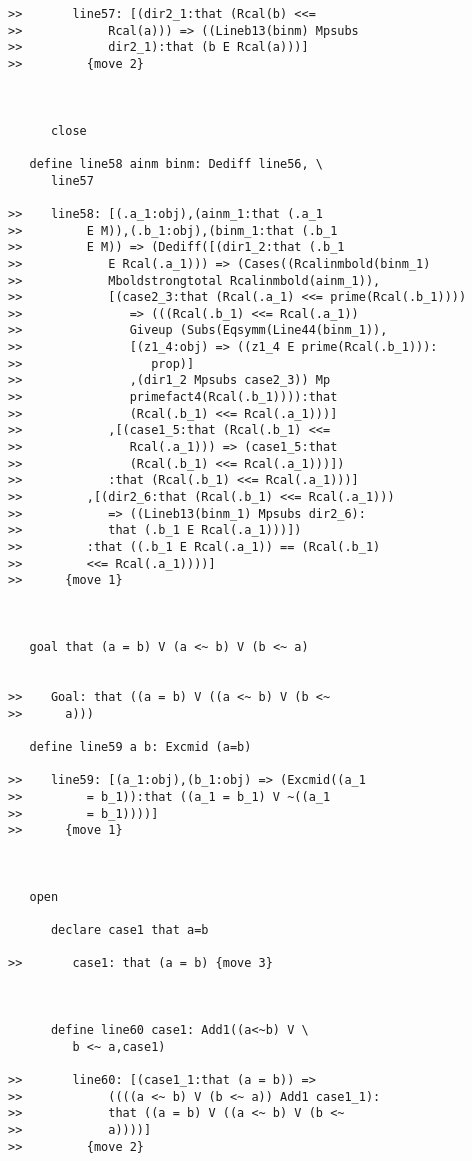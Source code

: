 \documentclass[12pt]{article}
\begin{document}
\begin{verbatim}
>>       line57: [(dir2_1:that (Rcal(b) <<=
>>            Rcal(a))) => ((Lineb13(binm) Mpsubs
>>            dir2_1):that (b E Rcal(a)))]
>>         {move 2}



      close

   define line58 ainm binm: Dediff line56, \
      line57

>>    line58: [(.a_1:obj),(ainm_1:that (.a_1
>>         E M)),(.b_1:obj),(binm_1:that (.b_1
>>         E M)) => (Dediff([(dir1_2:that (.b_1
>>            E Rcal(.a_1))) => (Cases((Rcalinmbold(binm_1)
>>            Mboldstrongtotal Rcalinmbold(ainm_1)),
>>            [(case2_3:that (Rcal(.a_1) <<= prime(Rcal(.b_1))))
>>               => (((Rcal(.b_1) <<= Rcal(.a_1))
>>               Giveup (Subs(Eqsymm(Line44(binm_1)),
>>               [(z1_4:obj) => ((z1_4 E prime(Rcal(.b_1))):
>>                  prop)]
>>               ,(dir1_2 Mpsubs case2_3)) Mp
>>               primefact4(Rcal(.b_1)))):that
>>               (Rcal(.b_1) <<= Rcal(.a_1)))]
>>            ,[(case1_5:that (Rcal(.b_1) <<=
>>               Rcal(.a_1))) => (case1_5:that
>>               (Rcal(.b_1) <<= Rcal(.a_1)))])
>>            :that (Rcal(.b_1) <<= Rcal(.a_1)))]
>>         ,[(dir2_6:that (Rcal(.b_1) <<= Rcal(.a_1)))
>>            => ((Lineb13(binm_1) Mpsubs dir2_6):
>>            that (.b_1 E Rcal(.a_1)))])
>>         :that ((.b_1 E Rcal(.a_1)) == (Rcal(.b_1)
>>         <<= Rcal(.a_1))))]
>>      {move 1}



   goal that (a = b) V (a <~ b) V (b <~ a)


>>    Goal: that ((a = b) V ((a <~ b) V (b <~
>>      a)))

   define line59 a b: Excmid (a=b)

>>    line59: [(a_1:obj),(b_1:obj) => (Excmid((a_1
>>         = b_1)):that ((a_1 = b_1) V ~((a_1
>>         = b_1))))]
>>      {move 1}



   open

      declare case1 that a=b

>>       case1: that (a = b) {move 3}



      define line60 case1: Add1((a<~b) V \
         b <~ a,case1)

>>       line60: [(case1_1:that (a = b)) =>
>>            ((((a <~ b) V (b <~ a)) Add1 case1_1):
>>            that ((a = b) V ((a <~ b) V (b <~
>>            a))))]
>>         {move 2}




\end{verbatim}
\end{document}
